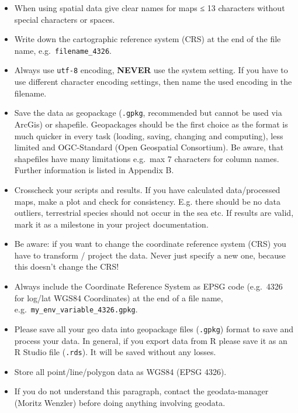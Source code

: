 \documentclass[
  english,
]{article}
\providecommand{\tightlist}{%
  \setlength{\itemsep}{0pt}\setlength{\parskip}{0pt}}
\begin{document}
\begin{itemize}
\tightlist
\item
  When using spatial data give clear names for maps ≤ 13 characters
  without special characters or spaces.
\item
  Write down the cartographic reference system (CRS) at the end of the
  file name, e.g.~\texttt{filename\_4326}.
\item
  Always use \texttt{utf-8} encoding, \textbf{NEVER} use the system
  setting. If you have to use different character encoding settings,
  then name the used encoding in the filename.
\item
  Save the data as geopackage (\texttt{.gpkg}, recommended but cannot be
  used via ArcGis) or shapefile. Geopackages should be the first choice
  as the format is much quicker in every task (loading, saving, changing
  and computing), less limited and OGC-Standard (Open Geospatial
  Consortium). Be aware, that shapefiles have many limitations e.g.~max
  7 characters for column names. Further information is listed in
  Appendix B.
\item
  Crosscheck your scripts and results. If you have calculated
  data/processed maps, make a plot and check for consistency. E.g. there
  should be no data outliers, terrestrial species should not occur in
  the sea etc. If results are valid, mark it as a milestone in your
  project documentation.
\item
  Be aware: if you want to change the coordinate reference system (CRS)
  you have to transform / project the data. Never just specify a new
  one, because this doesn't change the CRS!
\item
  Always include the Coordinate Reference System as EPSG code (e.g.~4326
  for log/lat WGS84 Coordinates) at the end of a file name,
  e.g.~\texttt{my\_env\_variable\_4326.gpkg}.
\item
  Please save all your geo data into geopackage files (\texttt{.gpkg})
  format to save and process your data. In general, if you export data
  from R please save it as an R Studio file (\texttt{.rds}). It will be
  saved without any losses.
\item
  Store all point/line/polygon data as WGS84 (EPSG 4326).
\item
  If you do not understand this paragraph, contact the geodata-manager
  (Moritz Wenzler) before doing anything involving geodata.
\end{itemize}

\newpage
\end{document}

